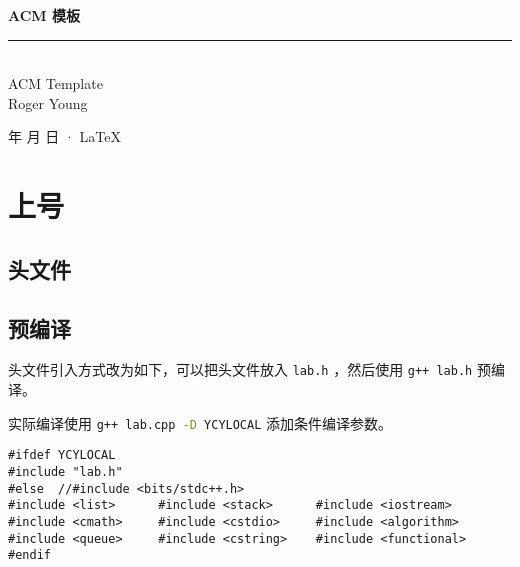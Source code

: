 \documentclass[cn,11pt,black,normal,founder]{elegantbook}
\begin{document}
\newcommand\mfrac[2]{\dfrac{#1\smash[b]{\strut}}{#2\smash[t]{\strut}}}
\newcommand\ee{\mathrm{e}}
\newcommand\dd{\mathrm{d}}
\newcommand\uppi{\mathrm{\pi}}

\begin{titlepage}
	\vspace*{35ex}%
	\begin{minipage}{.9\textwidth}
	\flushright
		{\textbf{ACM 模板}}\\%
		\rule{\linewidth}{1pt}\\ \vspace{2ex}
		{\textsf{ACM Template}} \\%
		\vspace{30ex}%
		{Roger Young}%
	\end{minipage}
	\vfill\centering
	{\number\year 年 \number\month 月 \number\day 日 · \LaTeX{}}
\end{titlepage}
\clearpage{\hypersetup{hidelinks}\tableofcontents}

\clearpage

\chapter{上号}

\section{头文件}



\section{预编译}

头文件引入方式改为如下，可以把头文件放入 \lstinline[style=cpp]{lab.h} ，然后使用 \lstinline[language=bash]{g++ lab.h} 预编译。

实际编译使用 \lstinline[language=bash]{g++ lab.cpp -D YCYLOCAL} 添加条件编译参数。

\begin{lstlisting}[style=cpp]
#ifdef YCYLOCAL
#include "lab.h"
#else  //#include <bits/stdc++.h>
#include <list>      #include <stack>      #include <iostream>
#include <cmath>     #include <cstdio>     #include <algorithm>
#include <queue>     #include <cstring>    #include <functional>
#endif
\end{lstlisting}
\end{document}
